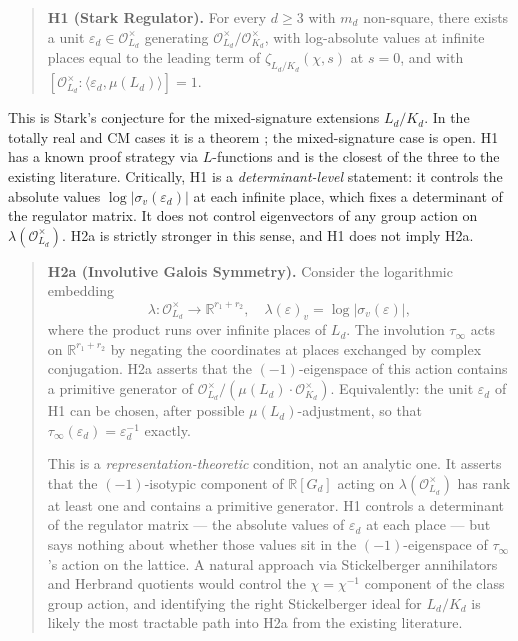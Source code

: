 \documentclass[12pt]{article}
\theoremstyle{plain}
\theoremstyle{definition}
\theoremstyle{remark}
\newcommand{\OO}{\mathcal{O}}
\newcommand{\eps}{\varepsilon}
\begin{document}
\begin{quote}
\textbf{H1 (Stark Regulator).} For every $d \geq 3$ with $m_d$ non-square, there exists a unit $\eps_d \in \OO_{L_d}^\times$ generating $\OO_{L_d}^\times / \OO_{K_d}^\times$, with log-absolute values at infinite places equal to the leading term of $\zeta_{L_d/K_d}(\chi, s)$ at $s = 0$, and with $[\OO_{L_d}^\times : \langle \eps_d, \mu(L_d) \rangle] = 1$.
\end{quote}

This is Stark's conjecture \cite{stark1971} for the mixed-signature extensions $L_d / K_d$. In the totally real and CM cases it is a theorem \cite{tate1984}; the mixed-signature case is open. H1 has a known proof strategy via $L$-functions and is the closest of the three to the existing literature. Critically, H1 is a \emph{determinant-level} statement: it controls the absolute values $\log|\sigma_v(\eps_d)|$ at each infinite place, which fixes a determinant of the regulator matrix. It does not control eigenvectors of any group action on $\lambda(\OO_{L_d}^\times)$. H2a is strictly stronger in this sense, and H1 does not imply H2a.

\begin{quote}
\textbf{H2a (Involutive Galois Symmetry).} Consider the logarithmic embedding
\[
  \lambda : \OO_{L_d}^\times \to \mathbb{R}^{r_1+r_2}, \quad \lambda(\eps)_v = \log|\sigma_v(\eps)|,
\]
where the product runs over infinite places of $L_d$. The involution $\tau_\infty$ acts on $\mathbb{R}^{r_1+r_2}$ by negating the coordinates at places exchanged by complex conjugation. H2a asserts that the $(-1)$-eigenspace of this action contains a primitive generator of $\OO_{L_d}^\times / (\mu(L_d) \cdot \OO_{K_d}^\times)$. Equivalently: the unit $\eps_d$ of H1 can be chosen, after possible $\mu(L_d)$-adjustment, so that $\tau_\infty(\eps_d) = \eps_d^{-1}$ exactly.

This is a \emph{representation-theoretic} condition, not an analytic one. It asserts that the $(-1)$-isotypic component of $\mathbb{R}[G_d]$ acting on $\lambda(\OO_{L_d}^\times)$ has rank at least one and contains a primitive generator. H1 controls a determinant of the regulator matrix — the absolute values of $\eps_d$ at each place — but says nothing about whether those values sit in the $(-1)$-eigenspace of $\tau_\infty$'s action on the lattice. A natural approach via Stickelberger annihilators and Herbrand quotients would control the $\chi = \chi^{-1}$ component of the class group action, and identifying the right Stickelberger ideal for $L_d / K_d$ is likely the most tractable path into H2a from the existing literature.
\end{quote}
\end{document}
